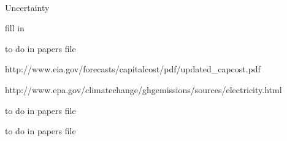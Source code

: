 \documentclass{easychithesis}
\begin{document}
\paragraph{} Uncertainty






\singlespacing
\pagebreak
{}

\begin{thebibliography}{99}

fill in

to do in papers file


http://www.eia.gov/forecasts/capitalcost/pdf/updated\_capcost.pdf

http://www.epa.gov/climatechange/ghgemissions/sources/electricity.html

to do in papers file

to do in papers file


\end{thebibliography}
\end{document}
